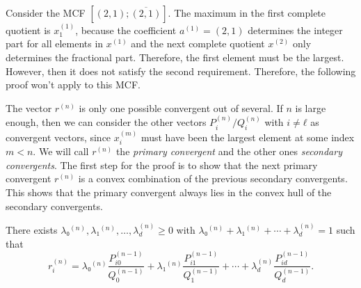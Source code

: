 \begin{example}
  Consider the MCF $[(2, 1); \overline{(2, 1)}]$.
  The maximum in the first complete quotient is $x^{(1)}_1$,
  because the coefficient $a^{(1)} = (2, 1)$ determines the integer part
  for all elements in $x^{(1)}$ and the next complete quotient $x^{(2)}$
  only determines the fractional part.
  Therefore, the first element must be the largest.
  However, then it does not satisfy the second requirement.
  Therefore, the following proof won't apply to this MCF.
\end{example}

The vector $r^{(n)}$ is only one possible convergent out of several.
If $n$ is large enough, then we can consider the other vectors
$P_i^{(n)}/Q_i^{(n)}$ with $i ≠ ℓ$ as convergent vectors,
since $x_i^{(m)}$ must have been the largest element at some index $m < n$.
We will call $r^{(n)}$ the \emph{primary convergent} and the other ones
\emph{secondary convergents}.
The first step for the proof is to show that the next primary convergent $r^{(n)}$ is a
convex combination of the previous secondary convergents.
This shows that the primary convergent always lies in the convex hull of the
secondary convergents.

\begin{lemma}
  \label{lem:conv-conv}
  There exists $λ₀^{(n)}, λ₁^{(n)}, …, λ_d^{(n)} ≥ 0$ with $λ₀^{(n)} + λ₁^{(n)} + ⋯ + λ_d^{(n)} = 1$ such that
  \[
    r_i^{(n)} = λ₀^{(n)} \frac{P_{i0}^{(n-1)}}{Q_0^{(n-1)}} + λ₁^{(n)} \frac{P_{i1}^{(n-1)}}{Q_1^{(n-1)}} + ⋯ + λ_d^{(n)} \frac{P_{id}^{(n-1)}}{Q_d^{(n-1)}}.
  \]
\end{lemma}

